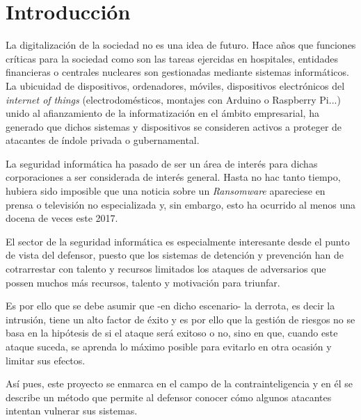 
\chapter{Introducción}

La digitalización de la sociedad no es una idea de futuro. Hace años que funciones críticas para la sociedad
como son las tareas ejercidas en hospitales, entidades financieras o centrales nucleares son gestionadas mediante sistemas informáticos. 
La ubicuidad de dispositivos, ordenadores, móviles, dispositivos electrónicos del \emph{internet of things}
(electrodomésticos, montajes con Arduino o Raspberry Pi...) unido al afianzamiento de la informatización en el ámbito empresarial, ha generado
que dichos sistemas y dispositivos se consideren activos a proteger de atacantes de índole privada o gubernamental.

La seguridad informática ha pasado de ser un área de interés para dichas corporaciones a ser considerada de interés general.
Hasta no hac tanto tiempo, hubiera sido imposible que una noticia sobre un \emph{Ransomware} apareciese en prensa o televisión no especializada y, sin embargo, esto ha ocurrido
al menos una docena de veces este 2017.

El sector de la seguridad informática es especialmente interesante desde el punto de vista del defensor, puesto que
los sistemas de detención y prevención han de cotrarrestar con talento y recursos limitados los ataques de adversarios
que possen muchos más recursos, talento y motivación para triunfar.

Es por ello que se debe asumir que -en dicho escenario- la derrota, es decir la intrusión, tiene un alto factor de éxito y es 
por ello que la gestión de riesgos no se basa en la hipótesis de si el ataque será exitoso o no, sino en que, cuando
este ataque suceda, se aprenda lo máximo posible para evitarlo en otra ocasión y limitar sus efectos.

Así pues, este proyecto se enmarca en el campo de la contrainteligencia y en él se describe un método que permite al defensor conocer cómo algunos atacantes intentan vulnerar sus sistemas. 






